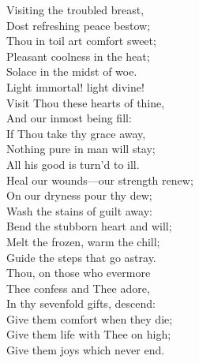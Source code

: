 {Visiting the troubled breast,\\
Dost refreshing peace bestow;\\
Thou in toil art comfort sweet;\\
Pleasant coolness in the heat;\\
Solace in the midst of woe.\\[0.55em]
Light immortal! light divine!\\
Visit Thou these hearts of thine,\\
And our inmost being fill:\\
If Thou take thy grace away,\\
Nothing pure in man will stay;\\
All his good is turn'd to ill.\\[0.55em]
Heal our wounds---our strength renew;\\
On our dryness pour thy dew;\\
Wash the stains of guilt away:\\
Bend the stubborn heart and will;\\
Melt the frozen, warm the chill;\\
Guide the steps that go astray.\\[0.55em]
Thou, on those who evermore\\
Thee confess and Thee adore,\\
In thy sevenfold gifts, descend:\\
Give them comfort when they die;\\
Give them life with Thee on high;\\
Give them joys which never end.}
